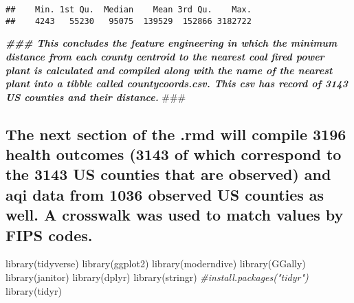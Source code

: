 \documentclass[
]{article}
\newenvironment{Shaded}{\begin{snugshade}}{\end{snugshade}}
\newcommand{\AlertTok}[1]{\textcolor[rgb]{0.94,0.16,0.16}{#1}}
\newcommand{\CommentTok}[1]{\textcolor[rgb]{0.56,0.35,0.01}{\textit{#1}}}
\newcommand{\DocumentationTok}[1]{\textcolor[rgb]{0.56,0.35,0.01}{\textbf{\textit{#1}}}}
\newcommand{\FunctionTok}[1]{\textcolor[rgb]{0.00,0.00,0.00}{#1}}
\newcommand{\NormalTok}[1]{#1}
\newcommand{\SpecialCharTok}[1]{\textcolor[rgb]{0.00,0.00,0.00}{#1}}
\begin{document}
\begin{Shaded}
\end{Shaded}

\begin{verbatim}
##    Min. 1st Qu.  Median    Mean 3rd Qu.    Max. 
##    4243   55230   95075  139529  152866 3182722
\end{verbatim}

\begin{Shaded}
\begin{Highlighting}[]
\DocumentationTok{\#\#\# This concludes the feature engineering in which the minimum distance from each county centroid to the nearest coal fired power plant is calculated and compiled along with the name of the nearest plant into a tibble called countycoords.csv. This csv has record of 3143 US counties and their distance. }\AlertTok{\#\#\#}\DocumentationTok{ }
\end{Highlighting}
\end{Shaded}

\hypertarget{the-next-section-of-the-.rmd-will-compile-3196-health-outcomes-3143-of-which-correspond-to-the-3143-us-counties-that-are-observed-and-aqi-data-from-1036-observed-us-counties-as-well.-a-crosswalk-was-used-to-match-values-by-fips-codes.}{%
\subsection{The next section of the .rmd will compile 3196 health
outcomes (3143 of which correspond to the 3143 US counties that are
observed) and aqi data from 1036 observed US counties as well. A
crosswalk was used to match values by FIPS
codes.}\label{the-next-section-of-the-.rmd-will-compile-3196-health-outcomes-3143-of-which-correspond-to-the-3143-us-counties-that-are-observed-and-aqi-data-from-1036-observed-us-counties-as-well.-a-crosswalk-was-used-to-match-values-by-fips-codes.}}

\begin{Shaded}
\begin{Highlighting}[]
\FunctionTok{library}\NormalTok{(tidyverse)}
\FunctionTok{library}\NormalTok{(ggplot2)}
\FunctionTok{library}\NormalTok{(moderndive)}
\FunctionTok{library}\NormalTok{(GGally)}
\FunctionTok{library}\NormalTok{(janitor)}
\FunctionTok{library}\NormalTok{(dplyr)}
\FunctionTok{library}\NormalTok{(stringr)}
\CommentTok{\#install.packages("tidyr")}
\FunctionTok{library}\NormalTok{(tidyr)}
\end{Highlighting}
\end{Shaded}
\end{document}
